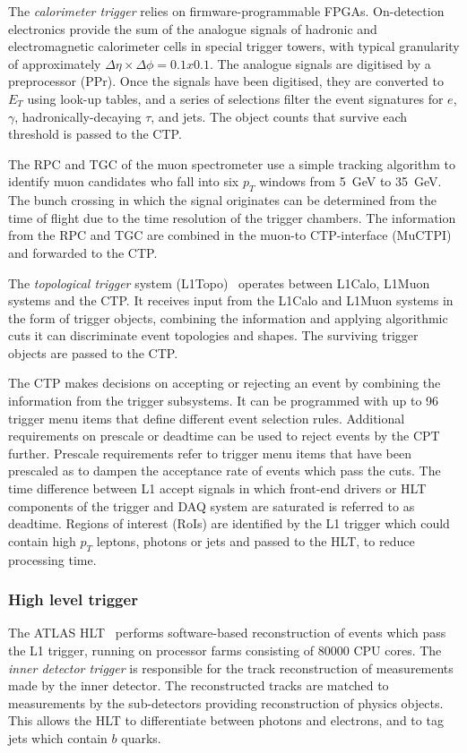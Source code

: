 The \emph{calorimeter trigger} relies on firmware-programmable FPGAs. On-detection electronics provide the sum of the analogue signals of hadronic and electromagnetic calorimeter cells in special trigger towers, with typical granularity of approximately $\Delta\eta \times \Delta\phi = 0.1 x 0.1$. The analogue signals are digitised by a preprocessor (PPr). Once the signals have been digitised, they are converted to $E_{T}$ using look-up tables, and a series of selections filter the event signatures for $e$, $\gamma$, hadronically-decaying $\tau$, and jets. The object counts that survive each threshold is passed to the CTP. 

The RPC and TGC of the muon spectrometer use a simple tracking algorithm to identify muon candidates who fall into six $p_{T}$ windows from \SI{5}{\giga\electronvolt} to \SI{35}{\giga\electronvolt}. The bunch crossing in which the signal originates can be determined from the time of flight due to the time resolution of the trigger chambers. The information from the RPC and TGC are combined in the muon-to CTP-interface (MuCTPI) and forwarded to the CTP. 

The \emph{topological trigger} system (L1Topo)~\cite{ATLAS:L1Topo} operates between L1Calo, L1Muon systems and the CTP. It receives input from the L1Calo and L1Muon systems in the form of trigger objects, combining the information and applying algorithmic cuts it can discriminate event topologies and shapes. The surviving trigger objects are passed to the CTP.

The CTP makes decisions on accepting or rejecting an event by combining the information from the trigger subsystems. It can be programmed with up to 96 trigger menu items that define different event selection rules. Additional requirements on prescale or deadtime can be used to reject events by the CPT further. Prescale requirements refer to trigger menu items that have been prescaled as to dampen the acceptance rate of events which pass the cuts. The time difference between L1 accept signals in which front-end drivers or HLT components of the trigger and DAQ system are saturated is referred to as deadtime. Regions of interest (RoIs) are identified by the L1 trigger which could contain high $p_T$ leptons, photons or jets and passed to the HLT, to reduce processing time. 

\subsubsection{High level trigger}
The ATLAS HLT~\cite{ATLAS:HLT-TDR,ATLAS:TDAQ-Run2} performs software-based reconstruction of events which pass the L1 trigger, running on processor farms consisting of 80000 CPU cores. The \emph{inner detector trigger} is responsible for the track reconstruction of measurements made by the inner detector. The reconstructed tracks are matched to measurements by the sub-detectors providing reconstruction of physics objects. This allows the HLT to differentiate between photons and electrons, and to tag jets which contain $b$ quarks. 

